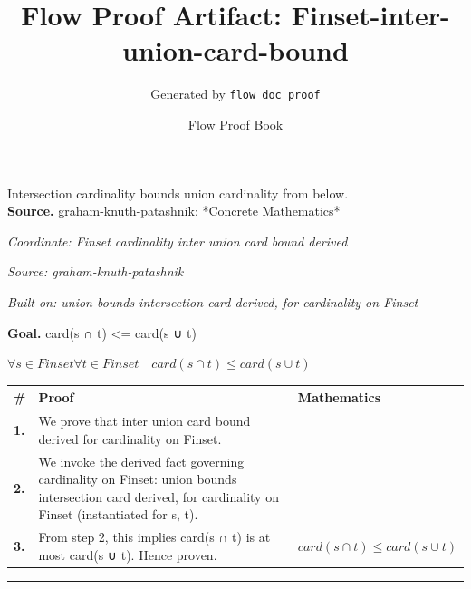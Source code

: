 \documentclass[11pt]{article}
\title{Flow Proof Artifact: Finset-inter-union-card-bound}
\author{Generated by \texttt{flow doc proof}}
\date{Flow Proof Book}
\theoremstyle{definition}
\begin{document}
\maketitle
Intersection cardinality bounds union cardinality from below.\\[0.5em]
\textbf{Source.} graham-knuth-patashnik: *Concrete Mathematics*\\[0.5em]
\bigskip
{}\par
\smallskip\noindent\textit{Coordinate: Finset \cdot cardinality \cdot inter union card bound derived}\par
\smallskip\noindent\textit{Source: graham-knuth-patashnik}\par
\smallskip\noindent\textit{Built on: union bounds intersection card derived, for cardinality on Finset}\par
\medskip
\noindent\textbf{Goal.} card(s ∩ t) <= card(s ∪ t)\par
\noindent$\displaystyle \forall s \in Finset \forall t \in Finset\quad card(s ∩ t) \le card(s ∪ t)$\par
\medskip
\noindent
\begin{tabular}{@{} >{\raggedright\arraybackslash}p{} >{\raggedright\arraybackslash}p{} >{\raggedleft\arraybackslash}p{} @{}}
\textbf{\#} & \textbf{Proof} & \textbf{Mathematics} \\
\midrule
\textbf{1.} & We prove that inter union card bound derived for cardinality on Finset. & \\[0.45em]
\textbf{2.} & We invoke the derived fact governing cardinality on Finset: union bounds intersection card derived, for cardinality on Finset (instantiated for s, t). & \\[0.45em]
\textbf{3.} & From step 2, this implies card(s ∩ t) is at most card(s ∪ t). Hence proven. & $\displaystyle card(s ∩ t) \le card(s ∪ t)$ \\[0.45em]
\bottomrule
\end{tabular}
\label{thm:Finset-cardinality-inter_union_card_bound_derived}
\par\medskip\hrule
\end{document}
